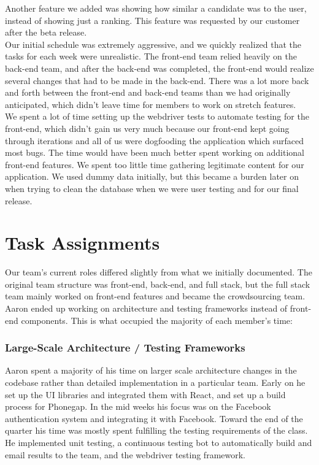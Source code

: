 \documentclass[11pt]{article}
\begin{document}
Another feature we added was showing how similar a candidate was to the user, instead of showing just a ranking. This feature was requested by our customer after the beta release.\\

Our initial schedule was extremely aggressive, and we quickly realized that the tasks for each week were unrealistic. The front-end team relied heavily on the back-end team, and after the back-end was completed, the front-end would realize several changes that had to be made in the back-end. There was a lot more back and forth between the front-end and back-end teams than we had originally anticipated, which didn't leave time for members to work on stretch features.\\

We spent a lot of time setting up the webdriver tests to automate testing for the front-end, which didn't gain us very much because our front-end kept going through iterations and all of us were dogfooding the application which surfaced most bugs. The time would have been much better spent working on additional front-end features. We spent too little time gathering legitimate content for our application. We used dummy data initially, but this became a burden later on when trying to clean the database when we were user testing and for our final release.

\section{Task Assignments}

Our team's current roles differed slightly from what we initially documented. The original team structure was front-end, back-end, and full stack, but the full stack team mainly worked on front-end features and became the crowdsourcing team. Aaron ended up working on architecture and testing frameworks instead of front-end components. This is what occupied the majority of each member's time:

\subsubsection{Large-Scale Architecture / Testing Frameworks}

Aaron spent a majority of his time on larger scale architecture changes in the codebase rather than detailed implementation in a particular team. Early on he set up the UI libraries and integrated them with React, and set up a build process for Phonegap. In the mid weeks his focus was on the Facebook authentication system and integrating it with Facebook. Toward the end of the quarter his time was mostly spent fulfilling the testing requirements of the class. He implemented unit testing, a continuous testing bot to automatically build and email results to the team, and the webdriver testing framework.
\end{document}
